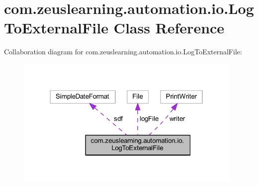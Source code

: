 \hypertarget{classcom_1_1zeuslearning_1_1automation_1_1io_1_1LogToExternalFile}{}\section{com.\+zeuslearning.\+automation.\+io.\+Log\+To\+External\+File Class Reference}
\label{classcom_1_1zeuslearning_1_1automation_1_1io_1_1LogToExternalFile}


Collaboration diagram for com.\+zeuslearning.\+automation.\+io.\+Log\+To\+External\+File\+:\nopagebreak
\begin{figure}[H]
\begin{center}
\leavevmode
\includegraphics[width=310pt]{da/d02/classcom_1_1zeuslearning_1_1automation_1_1io_1_1LogToExternalFile__coll__graph}
\end{center}
\end{figure}
